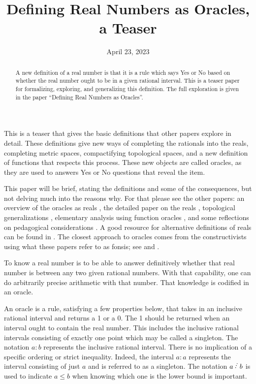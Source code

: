 \documentclass[12pt]{article}
\title{Defining Real Numbers as Oracles, a Teaser}
\date{April 23, 2023}
\begin{document}
\maketitle
\begin{abstract}
A new definition of a real number is that it is a rule which says Yes or No based on whether the real number ought to be in a given rational interval. This is a teaser paper for formalizing, exploring, and generalizing this definition. The full exploration is given in the paper ``Defining Real Numbers as Oracles''. 
\end{abstract}

This is a teaser that gives the basic definitions that other papers explore in detail. These definitions give new ways of completing the rationals into the reals, completing metric spaces, compactifying topological spaces, and a new definition of functions that respects this process. These new objects are called oracles, as they are used to answers Yes or No questions that reveal the item. 

This paper will be brief, stating the definitions and some of the consequences, but not delving much into the reasons why. For that please see the other papers: an overview of the oracles as reals \cite{taylor23over}, the detailed paper on the reals \cite{taylor23main}, topological generalizations \cite{taylor23metric}, elementary analysis using function oracles \cite{taylor23funora}, and some reflections on pedagogical considerations \cite{taylor23edu}. A good resource for alternative definitions of reals can be found in \cite{ittay-2015}. The closest approach to oracles comes from the constructivists using what these papers refer to as fonsis; see \cite{bridger} and \cite{bridges}. 

To know a real number is to be able to answer definitively whether that real number is between any two given rational numbers. With that capability, one can do arbitrarily precise arithmetic with that number. That knowledge is codified in an oracle. 


An oracle is a rule, satisfying a few properties below, that takes in an inclusive rational interval and returns a 1 or a 0. The 1 should be returned when an interval ought to contain the real number. This includes the inclusive rational intervals consisting of exactly one point which may be called a singleton. The notation $a:b$ represents the inclusive rational interval. There is no implication of a specific ordering or strict inequality.  Indeed, the  interval $a:a$ represents the interval consisting of just $a$ and is referred to as a singleton. The notation $a\lte b$ is used to indicate $a\leq b$ when knowing which one is the lower bound is important. 
\end{document}
